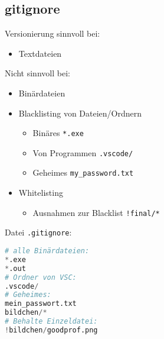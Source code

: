 \subsection{gitignore}
\begin{frame}
Versionierung sinnvoll bei:
\begin{itemize}
\item Textdateien
\end{itemize}
Nicht sinnvoll bei:
\begin{itemize}
\item Binärdateien
\end{itemize}
\end{frame}

\begin{frame}
\begin{itemize}
\item Blacklisting von Dateien/Ordnern
\begin{itemize}
\item Binäres \hfill \lstinline`*.exe`
\item Von Programmen \hfill \lstinline`.vscode/`
\item Geheimes \hfill \lstinline`my_password.txt`
\end{itemize}
\item Whitelisting
\begin{itemize}
\item Ausnahmen zur Blacklist \hfill \lstinline`!final/*`
\end{itemize}
\end{itemize}
\end{frame}

\begin{frame}[fragile]
Datei \lstinline`.gitignore`:
\begin{lstlisting}[numbers=none, language=python]
# alle Binärdateien:
*.exe
*.out
# Ordner von VSC:
.vscode/
# Geheimes:
mein_passwort.txt
bildchen/*
# Behalte Einzeldatei:
!bildchen/goodprof.png
\end{lstlisting}
\end{frame}

